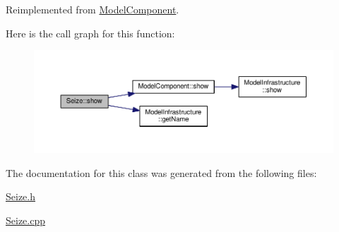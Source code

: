 Reimplemented from \hyperlink{class_model_component_ad8bc846e36b028eab7efb7da6c549eca}{Model\-Component}.



Here is the call graph for this function\-:\nopagebreak
\begin{figure}[H]
\begin{center}
\leavevmode
\includegraphics[width=350pt]{class_seize_a495ace3a156680b5816c8b285135322c_cgraph}
\end{center}
\end{figure}




The documentation for this class was generated from the following files\-:\begin{DoxyCompactItemize}
\item 
\hyperlink{_seize_8h}{Seize.\-h}\item 
\hyperlink{_seize_8cpp}{Seize.\-cpp}\end{DoxyCompactItemize}
